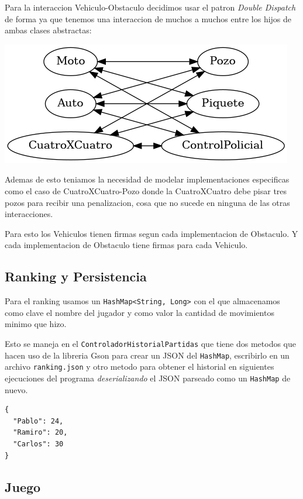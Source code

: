 \documentclass[titlepage,a4paper]{article}
\begin{document}
Para la interaccion Vehiculo-Obstaculo decidimos usar el patron \emph{Double
Dispatch} de forma ya que tenemos una interaccion de muchos a muchos entre los
hijos de ambas clases abstractas:

\begin{center}
\includegraphics[width=.9\linewidth]{diagramas/interaccionVehiculoObstaculo.png}
\end{center}

Ademas de esto teniamos la necesidad de modelar implementaciones especificas
como el caso de CuatroXCuatro-Pozo donde la CuatroXCuatro debe pisar tres pozos
para recibir una penalizacion, cosa que no sucede en ninguna de las otras interacciones.

Para esto los Vehiculos tienen firmas segun cada implementacion de Obstaculo.
Y cada implementacion de Obstaculo tiene firmas para cada Vehiculo.

\subsection{Ranking y Persistencia}
\label{sec:org0543ed4}

Para el ranking usamos un \texttt{HashMap<String, Long>} con el que
almacenamos como clave el nombre del jugador y como valor la cantidad
de movimientos minimo que hizo.

Esto se maneja en el \texttt{ControladorHistorialPartidas} que tiene dos
metodos que hacen uso de la libreria Gson para crear un JSON del
\texttt{HashMap}, escribirlo en un archivo \texttt{ranking.json} y otro metodo para
obtener el historial en siguientes ejecuciones del programa
\emph{deserializando} el JSON parseado como un \texttt{HashMap} de nuevo.

\begin{verbatim}
{
  "Pablo": 24,
  "Ramiro": 20,
  "Carlos": 30
}
\end{verbatim}

\subsection{Juego}
\label{sec:org2dc49b9}
\end{document}

